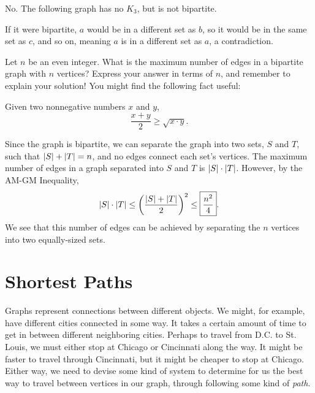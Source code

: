 \documentclass[11pt]{article}
\begin{document}
\begin{solution}
No. The following graph has no $K_3$, but is not bipartite.
\begin{center}
\end{center}
If it were bipartite, $a$ would be in a different set as $b$, so it would be in the same set as $c$, and so on, meaning $a$ is in a different set as $a$, a contradiction.
\end{solution}

\begin{problem}
Let $n$ be an even integer. What is the maximum number of edges in a bipartite graph with $n$ vertices? Express your answer
in terms of $n$, and remember to explain your solution! You might find the following fact useful:
\begin{theorem}[AM-GM]
\label{thm:am-gm}
Given two nonnegative numbers $x$ and $y$,
\[\frac{x + y}{2} \ge \sqrt{x \cdot y}.\]
\end{theorem}
\end{problem}

\begin{solution}
Since the graph is bipartite, we can separate the graph into two sets, $S$ and $T$, such that $\left\lvert S \right\rvert + \left\lvert T \right\rvert = n$,
and no edges connect each set's vertices. The maximum number of edges in a graph separated into $S$ and $T$ is $\left\lvert S \right\rvert \cdot \left\lvert T \right\rvert$. However, by the
AM-GM Inequality,
\[\left\lvert S \right\rvert \cdot \left\lvert T \right\rvert \le \left(\frac{\left\lvert S \right\rvert + \left\lvert T \right\rvert}{2}\right)^2 \le \boxed{\frac{n^2}{4}}. \]
We see that this number of edges can be achieved by separating the $n$ vertices into two equally-sized sets.
\end{solution}

\section{Shortest Paths}

Graphs represent connections between different objects. We might, for example, have different cities connected in some way.
It takes a certain amount of time to get in between different neighboring cities. Perhaps to travel from D.C. to St. Louis,
we must either stop at Chicago or Cincinnati along the way. It might be faster to travel through Cincinnati, but it might be
cheaper to stop at Chicago. Either way, we need to devise some kind of system to determine for us the best way to travel between
vertices in our graph, through following some kind of \textit{path}.
\end{document}
